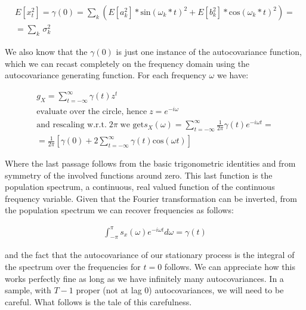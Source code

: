 \documentclass[12pt]{article} %
\begin{document}
\begin{equation}
\begin{aligned}
E[x_t^2]=\gamma(0)=\sum_k(E[a_k^2]*\text{sin}(\omega_k*t)^2+E[b_k^2]*\text{cos}(\omega_k*t)^2)=\\
=\sum_k\,\sigma_k^2
\end{aligned}
\end{equation}

We also know that the $\gamma(0)$ is just one instance of the autocovariance function, which we can recast completely on the frequency domain using the autocovariance generating function. For each frequency $\omega$ we have:

\begin{equation}
\begin{aligned}
g_X=\sum\limits_{t=-\infty}^{\infty} \gamma(t)z^t \\
\text{evaluate over the circle, hence}\; z=e^{-i\omega}\\
\text{and rescaling w.r.t.}\; 2\pi \;\text{we get}
s_X(\omega)=\sum\limits_{t=-\infty}^{\infty} \frac{1}{2\pi} \gamma(t)e^{-i\omega t}=\\
=\frac{1}{2\pi}\left[\gamma(0)+2\sum\limits_{t=-\infty}^{\infty} \gamma(t)\text{cos}(\omega t)\right]
\end{aligned}
\end{equation}

Where the last passage follows from the basic trigonometric identities and from symmetry of the involved functions around zero.
This last function is the population spectrum, a continuous, real valued function of the continuous frequency variable. Given that the Fourier transformation can be inverted, from the population spectrum we can recover frequencies as follows:

\begin{equation}
\begin{aligned}
\int_{-\pi}^{\pi} s_x(\omega)e^{-i\omega t}d\omega=\gamma(t)
\end{aligned}
\end{equation}

and the fact that the autocovariance of our stationary process is the integral of the spectrum over the frequencies for $t=0$ follows. We can appreciate how this works perfectly fine as long as we have infinitely many autocovariances. In a sample, with $T-1$ proper (not at lag 0) autocovariances, we will need to be careful. What follows is the tale of this carefulness. 

\newpage
\end{document}
